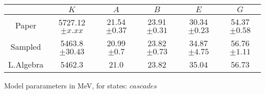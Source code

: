 \begin{tabular}{c | c  c  c  c  c }\hline \hline
          & $K$        & $A$             & $B$     & $E$        & $G$            \\ \hline
Paper     & 5727.12$\pm x.xx$ & 21.54$\pm 0.37$ & 23.91$\pm 0.31$ & 30.34 $\pm 0.23$ & 54.37$\pm 0.58$ \\ 
Sampled   & 5463.8  $\pm 30.43 $ & 20.99  $\pm 0.7 $ & 23.82  $\pm 0.73 $ & 34.87  $\pm 4.75 $ & 56.76  $\pm 1.11 $ \\ 
L.Algebra & 5462.3  & 21.0  & 23.82  & 35.04 & 56.73  \\ 
\hline\hline
\end{tabular}
\caption{Model pararameters in MeV, for states: $ cascades $}
